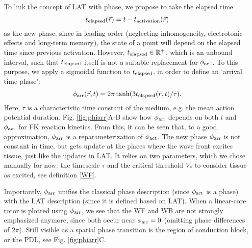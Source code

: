 \documentclass{article}
\newcommand{\phiact}{\ensuremath{\phi_{\rm act}}}
\newcommand{\phiarr}{\ensuremath{\phi_{\rm arr}}}
\newcommand{\tlap}{\ensuremath{t_{\rm elapsed}}}
\newcommand{\tact}{\ensuremath{t_{\rm activation}}}
\newcommand{\VS}{V_*}
\begin{document}
To link the concept of LAT with phase, we propose to take the elapsed time
\begin{align}
\tlap(\vec{r}) = t - \tact(\vec{r})
\end{align}
as the new phase, since in leading order (neglecting inhomogeneity, electrotonic effects and long-term memory), the state of a point will depend on the elapsed time since previous activation. However, $\tlap \in \mathbb{R}^+$, which is an unbound interval, such that $\tlap$ itself is not a suitable replacement for $\phiact$. To this purpose, we apply a sigmoidal function to $\tlap$, in order to define an `arrival time phase': 
\begin{align}
\phiarr(\vec{r},t) = 2 \pi \tanh (3 \tlap(\vec{r},t) / \tau). \label{phiarr}
\end{align}
Here, $\tau$ is a characteristic time constant of the medium, e.g. the mean action potential duration. Fig. \ref{fig:phiarr}A-B show how $\phiarr$ depends on both $t$ and $\phiact$ for FK reaction kinetics. From this, it can be seen that, to a good approximation, $\phiarr$ is a reparameterization of $\phiact$. The new phase $\phiarr$ is not constant in time, but gets update at the places where the wave front excites tissue, just like the updates in LAT. It relies on two parameters, which we chose manually for now: the timescale $\tau$ and the critical threshold $\VS$ to consider tissue as excited, see definition \eqref{WF}. 

Importantly, $\phiarr$ unifies the classical phase description (since $\phiact$ is a phase) with the LAT description (since it is defined based on LAT). When a linear-core rotor is plotted using $\phiarr$, we see that the WF and WB are not strongly emphasized anymore, since both occur near $\phiarr= 0$ (omitting phase differences of $2\pi$). Still visible as a spatial phase transition is the region of conduction block, or the PDL, see Fig. \ref{fig:phiarr}C. 
\end{document}
